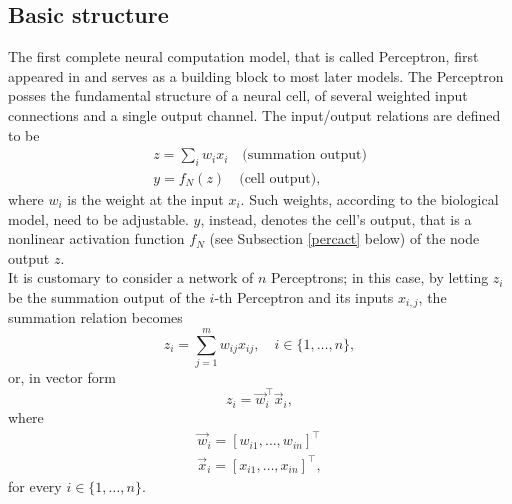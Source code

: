 \documentclass[%
    corpo=11pt,
    twoside,
    stile=classica,
    oldstyle,
    autoretitolo,
    tipotesi=magistrale,
    greek,
    evenboxes,
    english
]{toptesi}
\begin{document}
\subsection{Basic structure}
\label{percbs}
The first complete neural computation model, that is called Perceptron, first appeared in \citep{rosenblatt} and serves as a building block to most later models. The Perceptron posses the fundamental structure of a neural cell, of several weighted input connections and a single output channel. The input/output relations are defined to be
\begin{align}
z = \sum_{i}w_i x_i \quad \text{(summation output)} \label{summation}\\
y = f_N(z) \quad \text{(cell output)}, \label{nonlinear}
\end{align}
where $w_i$ is the weight at the input $x_i$. Such weights, according to the biological model, need to be adjustable. $y$, instead, denotes the cell's output, that is a nonlinear activation function $f_N$ (see Subsection \ref{percact} below) of the node output $z$. \\
It is customary to consider a network of $n$ Perceptrons; in this case, by letting $z_i$ be the summation output of the $i$-th Perceptron and its inputs $x_{i,j}$, the summation relation becomes
\begin{equation}
z_i = \sum_{j=1}^{m}w_{ij} x_{ij}, \quad i \in \{1,\dots,n\},
\end{equation}
or, in vector form 
\begin{equation}
\label{percout}
z_i = \vec{w}_i^{\intercal}\vec{x}_i,
\end{equation}
where
\begin{align*}
\vec{w}_i = \left[w_{i1}, \dots, w_{in} \right]^\intercal \\
\vec{x}_i = \left[x_{i1}, \dots, x_{in} \right]^\intercal,
\end{align*}
for every $i \in \{1,\dots,n\}$. 
\end{document}

